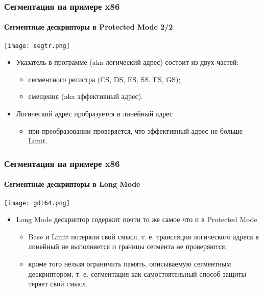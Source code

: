 \begin{frame}
\frametitle{Сегментация на примере x86}
\framesubtitle{Сегментные дескрипторы в Protected Mode 2/2}
\begin{center}
  \texttt{[image: segtr.png]}
\end{center}
\begin{itemize}
  \item Указатель в программе (aka логический адрес) состоит из двух частей:
  \begin{itemize}
    \item сегментного регистра (CS, DS, ES, SS, FS, GS);
    \item смещения (aka эффективный адрес).
  \end{itemize}
  \item Логический адрес пробразуется в линейный адрес
  \begin{itemize}
    \item при преобразовании проверяется, что эффективный адрес не больше Limit.
  \end{itemize}
\end{itemize}
\end{frame}

\begin{frame}
\frametitle{Сегментация на примере x86}
\framesubtitle{Сегментные дескрипторы в Long Mode}
\begin{center}
  \texttt{[image: gdt64.png]}
\end{center}
\begin{itemize}
  \item Long Mode дескриптор содержит почти то же самое что и в Protected Mode
  \begin{itemize}
    \item Base и Limit потеряли свой смысл, т. е. трансляция логического адреса
    в линейный не выполняется и границы сегмента не проверяются;
    \item кроме того нельзя ограничить память, описываемую сегментным
    дескриптором, т. е. сегментация как самостоятельный способ защиты теряет
    свой смысл.
  \end{itemize}
\end{itemize}
\end{frame}

